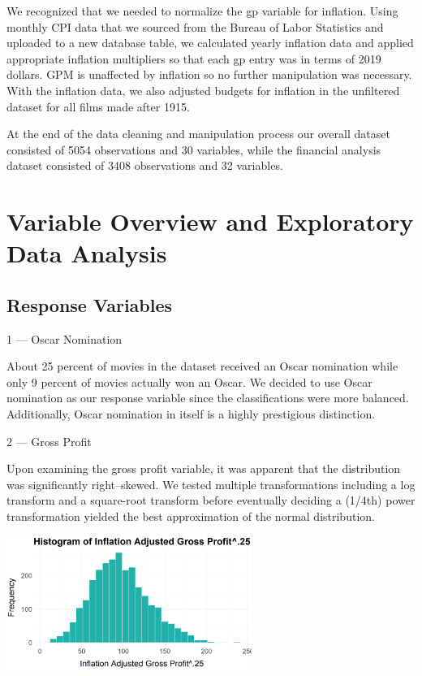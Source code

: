 \documentclass[10pt]{article}
\begin{document}
We recognized that we needed to normalize the gp variable for inflation. Using monthly CPI data that we sourced from the Bureau of Labor Statistics and uploaded to a new database table, we calculated yearly inflation data and applied appropriate inflation multipliers so that each gp entry was in terms of 2019 dollars. GPM is unaffected by inflation so no further manipulation was necessary. With the inflation data, we also adjusted budgets for inflation in the unfiltered dataset for all films made after 1915.

At the end of the data cleaning and manipulation process our overall dataset consisted of 5054 observations and 30 variables, while the financial analysis dataset consisted of 3408 observations and 32 variables.


\section{Variable Overview and Exploratory Data Analysis}

\subsection{Response Variables}

1 --- Oscar Nomination

About 25 percent of movies in the dataset received an Oscar nomination while only 9 percent of movies actually won an Oscar. We decided to use Oscar nomination as our response variable since the classifications were more balanced. Additionally, Oscar nomination in itself is a highly prestigious distinction.



2 --- Gross Profit

Upon examining the gross profit variable, it was apparent that the distribution was significantly right–skewed. We tested multiple transformations including a log transform and a square-root transform before eventually deciding a (1/4th) power transformation yielded the best approximation of the normal distribution.

\begin{center}
\includegraphics[width=8cm]{_assets/_eda/grossprofit_hist_t.png}
\end{center}
\end{document}
